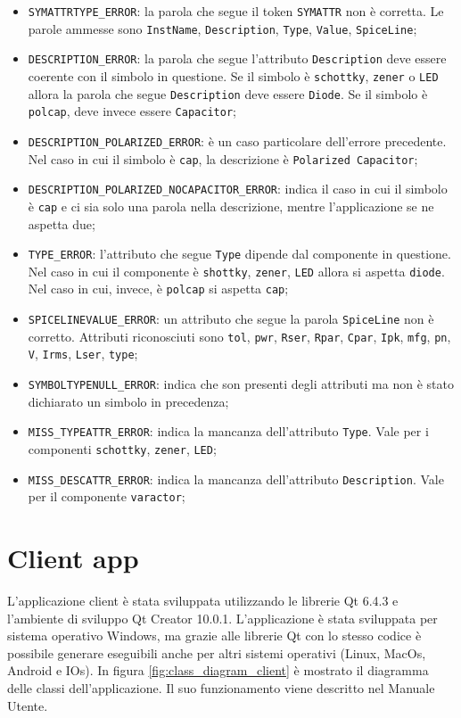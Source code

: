 \begin{itemize}
	\item \texttt{SYMATTRTYPE\_ERROR}: la parola che segue il token \texttt{SYMATTR} non è corretta. Le parole ammesse sono \texttt{InstName}, \texttt{Description}, \texttt{Type}, \texttt{Value}, \texttt{SpiceLine};
	\item \texttt{DESCRIPTION\_ERROR}: la parola che segue l'attributo \texttt{Description} deve essere coerente con il simbolo in questione. Se il simbolo è \texttt{schottky}, \texttt{zener} o \texttt{LED} allora la parola che segue \texttt{Description} deve essere \texttt{Diode}. Se il simbolo è \texttt{polcap}, deve invece essere \texttt{Capacitor};
	\item \texttt{DESCRIPTION\_POLARIZED\_ERROR}: è un caso particolare dell'errore precedente. Nel caso in cui il simbolo è \texttt{cap}, la descrizione è \texttt{Polarized Capacitor};
	\item \texttt{DESCRIPTION\_POLARIZED\_NOCAPACITOR\_ERROR}: indica il caso in cui il simbolo è \texttt{cap} e ci sia solo una parola nella descrizione, mentre l'applicazione se ne aspetta due;
	\item \texttt{TYPE\_ERROR}: l'attributo che segue \texttt{Type} dipende dal componente in questione. Nel caso in cui il componente è \texttt{shottky}, \texttt{zener}, \texttt{LED} allora si aspetta \texttt{diode}. Nel caso in cui, invece, è \texttt{polcap} si aspetta \texttt{cap};
	\item \texttt{SPICELINEVALUE\_ERROR}: un attributo che segue la parola \texttt{SpiceLine} non è corretto. Attributi riconosciuti sono \texttt{tol}, \texttt{pwr}, \texttt{Rser}, \texttt{Rpar}, \texttt{Cpar}, \texttt{Ipk}, \texttt{mfg}, \texttt{pn}, \texttt{V}, \texttt{Irms}, \texttt{Lser}, \texttt{type};
	\item \texttt{SYMBOLTYPENULL\_ERROR}: indica che son presenti degli attributi ma non è stato dichiarato un simbolo in precedenza;
	\item \texttt{MISS\_TYPEATTR\_ERROR}: indica la mancanza dell'attributo \texttt{Type}. Vale per i componenti \texttt{schottky}, \texttt{zener}, \texttt{LED};
	\item \texttt{MISS\_DESCATTR\_ERROR}: indica la mancanza dell'attributo \texttt{Description}. Vale per il componente \texttt{varactor};
	
\end{itemize}

\section{Client app}
L'applicazione client è stata sviluppata utilizzando le librerie Qt 6.4.3 e l'ambiente di sviluppo Qt Creator 10.0.1. L'applicazione è stata sviluppata per sistema operativo Windows, ma grazie alle librerie Qt con lo stesso codice è possibile generare eseguibili anche per altri sistemi operativi (Linux, MacOs, Android e IOs). In figura \ref{fig:class_diagram_client} è mostrato il diagramma delle classi dell'applicazione. Il suo funzionamento viene descritto nel Manuale Utente.

